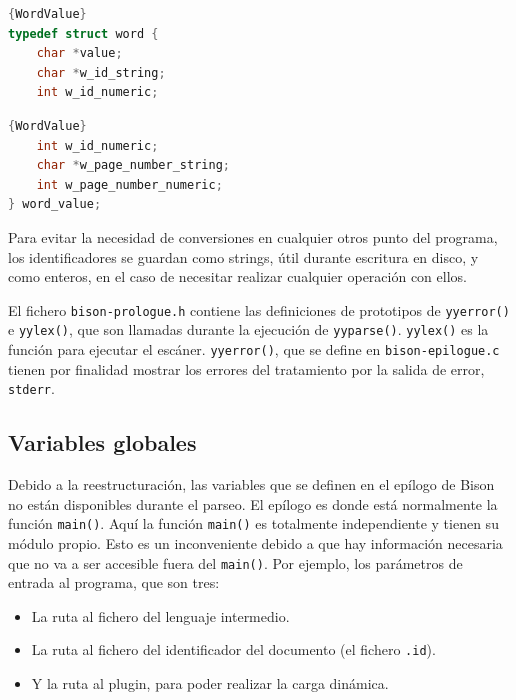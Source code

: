 \noindent\begin{minipage}{.45\textwidth}
    \begin{lstlisting}[language=C,caption={},frame=tlrb,label={}]{WordValue}
typedef struct word {
    char *value;
    char *w_id_string;
    int w_id_numeric;
    \end{lstlisting}
\end{minipage}\hfill
\begin{minipage}{.45\textwidth}
    \begin{lstlisting}[language=C,caption={},frame=tlrb,label={}]{WordValue}
    int w_id_numeric;
    char *w_page_number_string;
    int w_page_number_numeric;
} word_value;
    \end{lstlisting}
\end{minipage}

Para evitar la necesidad de conversiones en cualquier otros punto del programa, los identificadores se guardan como strings, útil durante escritura en disco, y como enteros, en el caso de necesitar realizar cualquier operación con ellos.

El fichero \verb|bison-prologue.h| contiene las definiciones de prototipos de \verb|yyerror()| e \verb|yylex()|, que son llamadas durante la ejecución de \verb|yyparse()|. \verb|yylex()| es la función para ejecutar el escáner. \verb|yyerror()|, que se define en \verb|bison-epilogue.c| tienen por finalidad mostrar los errores del tratamiento por la salida de error, \verb|stderr|.

\subsection{Variables globales}

Debido a la reestructuración, las variables que se definen en el epílogo de Bison no están disponibles durante el parseo. El epílogo es donde está normalmente la función \verb|main()|. Aquí la función \verb|main()| es totalmente independiente y tienen su módulo propio. Esto es un inconveniente debido a que hay información necesaria que no va a ser accesible fuera del \verb|main()|. Por ejemplo, los parámetros de entrada al programa, que son tres:

\begin{itemize}
    \item La ruta al fichero del lenguaje intermedio.
    \item La ruta al fichero del identificador del documento (el fichero \verb|.id|).
    \item Y la ruta al plugin, para poder realizar la carga dinámica.
\end{itemize}

